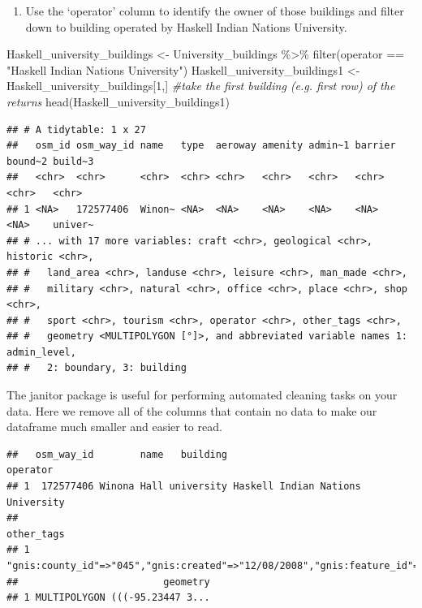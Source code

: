 \documentclass[
  paper=a4,
  ,captions=tableheading
]{scrartcl}
\newenvironment{Shaded}{\begin{snugshade}}{\end{snugshade}}
\newcommand{\CommentTok}[1]{\textcolor[rgb]{0.56,0.35,0.01}{\textit{#1}}}
\newcommand{\DecValTok}[1]{\textcolor[rgb]{0.00,0.00,0.81}{#1}}
\newcommand{\FunctionTok}[1]{\textcolor[rgb]{0.00,0.00,0.00}{#1}}
\newcommand{\NormalTok}[1]{#1}
\newcommand{\OtherTok}[1]{\textcolor[rgb]{0.56,0.35,0.01}{#1}}
\newcommand{\SpecialCharTok}[1]{\textcolor[rgb]{0.00,0.00,0.00}{#1}}
\newcommand{\StringTok}[1]{\textcolor[rgb]{0.31,0.60,0.02}{#1}}
\providecommand{\tightlist}{%
  \setlength{\itemsep}{0pt}\setlength{\parskip}{0pt}}
\begin{document}
\begin{enumerate}
\def\labelenumi{\arabic{enumi}.}
\setcounter{enumi}{2}
\tightlist
\item
  Use the `operator' column to identify the owner of those buildings and
  filter down to building operated by Haskell Indian Nations University.
\end{enumerate}

\begin{Shaded}
\begin{Highlighting}[]
\NormalTok{Haskell\_university\_buildings }\OtherTok{\textless{}{-}}\NormalTok{ University\_buildings }\SpecialCharTok{\%\textgreater{}\%} 
  \FunctionTok{filter}\NormalTok{(operator }\SpecialCharTok{==} \StringTok{"Haskell Indian Nations University"}\NormalTok{) }
\NormalTok{Haskell\_university\_buildings1 }\OtherTok{\textless{}{-}}\NormalTok{ Haskell\_university\_buildings[}\DecValTok{1}\NormalTok{,] }\CommentTok{\#take the first building (e.g. first row) of the returns}
\FunctionTok{head}\NormalTok{(Haskell\_university\_buildings1)}
\end{Highlighting}
\end{Shaded}

\begin{verbatim}
## # A tidytable: 1 x 27
##   osm_id osm_way_id name   type  aeroway amenity admin~1 barrier bound~2 build~3
##   <chr>  <chr>      <chr>  <chr> <chr>   <chr>   <chr>   <chr>   <chr>   <chr>  
## 1 <NA>   172577406  Winon~ <NA>  <NA>    <NA>    <NA>    <NA>    <NA>    univer~
## # ... with 17 more variables: craft <chr>, geological <chr>, historic <chr>,
## #   land_area <chr>, landuse <chr>, leisure <chr>, man_made <chr>,
## #   military <chr>, natural <chr>, office <chr>, place <chr>, shop <chr>,
## #   sport <chr>, tourism <chr>, operator <chr>, other_tags <chr>,
## #   geometry <MULTIPOLYGON [°]>, and abbreviated variable names 1: admin_level,
## #   2: boundary, 3: building
\end{verbatim}

The janitor package is useful for performing automated cleaning tasks on
your data. Here we remove all of the columns that contain no data to
make our dataframe much smaller and easier to read.

\begin{verbatim}
##   osm_way_id        name   building                          operator
## 1  172577406 Winona Hall university Haskell Indian Nations University
##                                                                                                other_tags
## 1 "gnis:county_id"=>"045","gnis:created"=>"12/08/2008","gnis:feature_id"=>"2510678","gnis:state_id"=>"20"
##                         geometry
## 1 MULTIPOLYGON (((-95.23447 3...
\end{verbatim}
\end{document}
